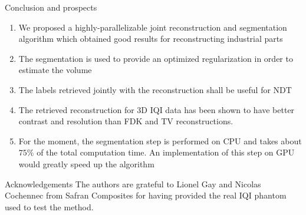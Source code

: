 \documentclass[latex]{beamer}
\begin{document}
\begin{frame}{Conclusion and prospects}
\begin{enumerate}
\item We proposed a highly-parallelizable joint reconstruction and segmentation algorithm which obtained good results for reconstructing industrial parts
\item The segmentation is used to provide an optimized regularization in order to estimate the volume 
\item The labels retrieved jointly with the reconstruction shall be useful for NDT
\item The retrieved reconstruction for 3D IQI data has been shown to have better contrast and resolution than FDK and TV reconstructions.
\item For the moment, the segmentation step is performed on CPU and takes about $75 \%$ of the total computation time. An implementation of this step on GPU would greatly speed up the algorithm 
\end{enumerate}
\end{frame}

\begin{frame}
\begin{center}
\Huge
{}
\end{center}
\end{frame}

\begin{frame}{Acknowledgements}
The authors are grateful to Lionel Gay and Nicolas Cochennec from Safran Composites for having provided the real IQI phantom used to test the method.
\end{frame}

\begin{frame}
\begin{center}
\Huge
{}
\end{center}
\end{frame}
\end{document}
